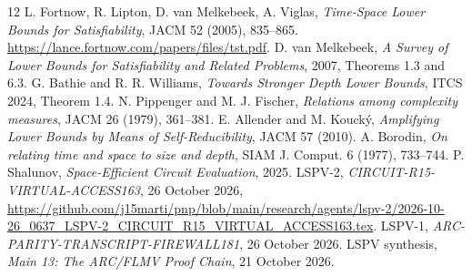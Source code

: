 \documentclass[11pt]{article}
\begin{document}
\begin{thebibliography}{12}
 L. Fortnow, R. Lipton, D. van Melkebeek, A. Viglas,
\emph{Time-Space Lower Bounds for Satisfiability}, JACM 52 (2005), 835--865.
\url{https://lance.fortnow.com/papers/files/tst.pdf}.
 D. van Melkebeek, \emph{A Survey of Lower Bounds for
Satisfiability and Related Problems}, 2007, Theorems 1.3 and 6.3.
 G. Bathie and R. R. Williams, \emph{Towards Stronger
Depth Lower Bounds}, ITCS 2024, Theorem 1.4.
 N. Pippenger and M. J. Fischer,
\emph{Relations among complexity measures}, JACM 26 (1979), 361--381.
 E. Allender and M. Kouck\'y,
\emph{Amplifying Lower Bounds by Means of Self-Reducibility}, JACM 57 (2010).
 A. Borodin, \emph{On relating time and space to
size and depth}, SIAM J. Comput. 6 (1977), 733--744.
 P. Shalunov, \emph{Space-Efficient Circuit Evaluation}, 2025.
 LSPV-2, \emph{CIRCUIT-R15-VIRTUAL-ACCESS163},
26 October 2026,
\url{https://github.com/j15marti/pnp/blob/main/research/agents/lspv-2/2026-10-26_0637_LSPV-2_CIRCUIT_R15_VIRTUAL_ACCESS163.tex}.
 LSPV-1, \emph{ARC-PARITY-TRANSCRIPT-FIREWALL181}, 26 October 2026.
 LSPV synthesis, \emph{Main 13: The ARC/FLMV Proof Chain}, 21 October 2026.
\end{thebibliography}
\end{document}
